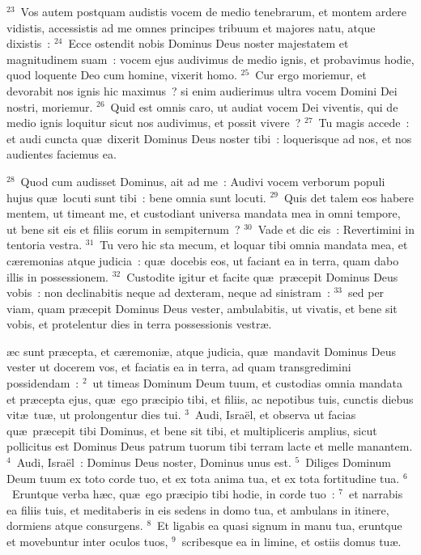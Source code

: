 ${}^{23}$~Vos autem postquam audistis vocem de medio tenebrarum, et montem ardere vidistis, accessistis ad me omnes principes tribuum et majores natu, atque dixistis~:
${}^{24}$~Ecce ostendit nobis Dominus Deus noster majestatem et magnitudinem suam~: vocem ejus audivimus de medio ignis, et probavimus hodie, quod loquente Deo cum homine, vixerit homo.
${}^{25}$~Cur ergo moriemur, et devorabit nos ignis hic maximus~? si enim audierimus ultra vocem Domini Dei nostri, moriemur.
${}^{26}$~Quid est omnis caro, ut audiat vocem Dei viventis, qui de medio ignis loquitur sicut nos audivimus, et possit vivere~?
${}^{27}$~Tu magis accede~: et audi cuncta qu\ae\ dixerit Dominus Deus noster tibi~: loquerisque ad nos, et nos audientes faciemus ea.


${}^{28}$~Quod cum audisset Dominus, ait ad me~: Audivi vocem verborum populi hujus qu\ae\ locuti sunt tibi~: bene omnia sunt locuti.
${}^{29}$~Quis det talem eos habere mentem, ut timeant me, et custodiant universa mandata mea in omni tempore, ut bene sit eis et filiis eorum in sempiternum~?
${}^{30}$~Vade et dic eis~: Revertimini in tentoria vestra.
${}^{31}$~Tu vero hic sta mecum, et loquar tibi omnia mandata mea, et c\ae remonias atque judicia~: qu\ae\ docebis eos, ut faciant ea in terra, quam dabo illis in possessionem.
${}^{32}$~Custodite igitur et facite qu\ae\ pr\ae cepit Dominus Deus vobis~: non declinabitis neque ad dexteram, neque ad sinistram~:
${}^{33}$~sed per viam, quam pr\ae cepit Dominus Deus vester, ambulabitis, ut vivatis, et bene sit vobis, et protelentur dies in terra possessionis vestr\ae .

\bchapter
{}\ae c sunt pr\ae cepta, et c\ae remoni\ae , atque judicia, qu\ae\ mandavit Dominus Deus vester ut docerem vos, et faciatis ea in terra, ad quam transgredimini possidendam~:
${}^{2}$~ut timeas Dominum Deum tuum, et custodias omnia mandata et pr\ae cepta ejus, qu\ae\ ego pr\ae cipio tibi, et filiis, ac nepotibus tuis, cunctis diebus vit\ae\ tu\ae , ut prolongentur dies tui.
${}^{3}$~Audi, Isra\"el, et observa ut facias qu\ae\ pr\ae cepit tibi Dominus, et bene sit tibi, et multipliceris amplius, sicut pollicitus est Dominus Deus patrum tuorum tibi terram lacte et melle manantem.
${}^{4}$~Audi, Isra\"el~: Dominus Deus noster, Dominus unus est.
${}^{5}$~Diliges Dominum Deum tuum ex toto corde tuo, et ex tota anima tua, et ex tota fortitudine tua.
${}^{6}$~Eruntque verba h\ae c, qu\ae\ ego pr\ae cipio tibi hodie, in corde tuo~:
${}^{7}$~et narrabis ea filiis tuis, et meditaberis in eis sedens in domo tua, et ambulans in itinere, dormiens atque consurgens.
${}^{8}$~Et ligabis ea quasi signum in manu tua, eruntque et movebuntur inter oculos tuos,
${}^{9}$~scribesque ea in limine, et ostiis domus tu\ae .


